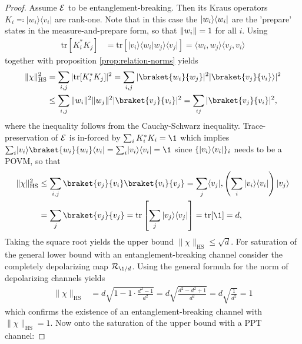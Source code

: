 \begin{proof}
Assume $\mathcal E$ to be entanglement-breaking. Then its Kraus operators $K_i \eqqcolon |w_i\rangle\langle v_i|$ are rank-one. Note that in this case the $\lvert w_i\rangle\langle w_i\rvert$ are the 'prepare' states in the measure-and-prepare form, so that $\lVert w_i\rVert=1$ for all $i$. Using
\begin{align*}
\text{tr}[K_i^* K_j] &= \text{tr}[|v_i\rangle\langle w_i|w_j\rangle\langle v_j|] = \langle w_i, w_j \rangle \langle v_j, v_i \rangle
\end{align*}
together with proposition \ref{prop:relation-norms} yields
\begin{align*}
\|\chi\|_{\text{HS}}^2 &= \sum_{i,j} |\text{tr}[K_i^* K_j]|^2 = \sum_{i,j} |\braket{ w_i}{w_j} |^2 |\braket{v_j}{ v_i }\rangle|^2 \\
&\le \sum_{i,j} \|w_i\|^2 \|w_j\|^2 |\braket{ v_j}{ v_i} |^2 = \sum_{ij}\vert \braket{v_j}{v_i}\vert ^2,
\end{align*} 
where the inequality follows from the Cauchy-Schwarz inequality. Trace-preservation of $\mathcal E$ is in-forced by $\sum_i K_i^*K_i = \1$ which implies $\sum_i \ket{v_i}\braket{w_i}{w_i}\bra{v_i} = \sum_i \pr{v_i} = \1$ since $\{\lvert v_i\rangle\langle v_i\rvert\}_i$ needs to be a POVM, so that 
\begin{align*}
    \norm \chi_\text{HS}^2 &\leq \sum_{i,j} \braket{v_j}{v_i} \braket{v_i}{v_j} = \sum_j \bra{v_j}, \left( \sum_i |v_i\rangle\langle v_i| \right) \ket{v_j } \\ &= \sum_j \braket{ v_j}{v_j}  = \text{tr}\left[ \sum_j |v_j\rangle\langle v_j| \right] = \text{tr}[\1] = d, 
\end{align*}
Taking the square root yields the upper bound $\|\chi\|_{\text{HS}} \le \sqrt{d}$. For saturation of the general lower bound with an entanglement-breaking channel consider the completely depolarizing map $ \mathcal{R}_{\1/d}$. Using the general formula for the norm of depolarizing channels yields
\begin{align*}
\|\chi\|_{\text{HS}} &= d \sqrt{1 - 1 \cdot \frac{d^2-1}{d^2}} = d \sqrt{\frac{d^2 - d^2 + 1}{d^2}} = d \sqrt{\frac{1}{d^2}} = 1
\end{align*}
which confirms the existence of an entanglement-breaking channel with $\|\chi\|_{\text{HS}} = 1$. Now onto the saturation of the upper bound with a PPT channel: 
\end{proof}

